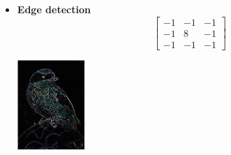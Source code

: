 \begin{itemize}
\begin{center}
    \end{center}
    \item \textbf{Edge detection}
    $$
    \quad
    \begin{bmatrix} 
    -1 & -1 & -1 \\
    -1 & 8 & -1 \\
    -1 & -1 & -1
    \end{bmatrix}
    $$
    \begin{center}
	\includegraphics[width=1in]{graphics/convolution/Convolution_gebs_KernelEdgeDetection.png}
    \end{center}
\end{itemize}
